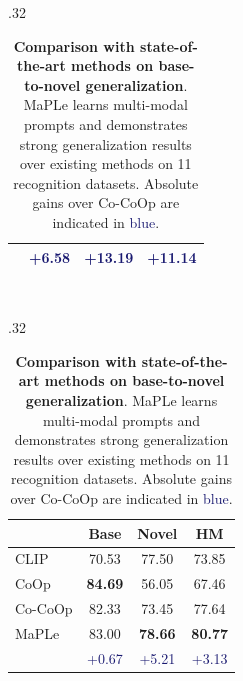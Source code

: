 \documentclass[10pt,twocolumn,letterpaper]{article}
\begin{document}
\begin{table}[t!]
\begin{subtable}[t]{.32\textwidth}
\begin{tabular}{l cc|c}
      &  \textcolor{MidnightBlue}{{+6.58}} &  \textcolor{MidnightBlue}{{+13.19}} &  \textcolor{MidnightBlue}{{+11.14}} \\
    \bottomrule
    \end{tabular}
    \end{subtable}
    ~
    \begin{subtable}[t]{.32\textwidth}
    \centering
    \caption{UCF101}
    \begin{tabular}{l cc|c}
    \toprule
    & Base & Novel & HM \\
    \midrule
    CLIP & 70.53 & {77.50} & 73.85 \\
    CoOp & \textbf{84.69} & 56.05 & 67.46 \\
    Co-CoOp & 82.33 & 73.45 & {77.64} \\
    \midrule
        \rowcolor{tabhighlight}
    MaPLe & 83.00 & \textbf{78.66} & \textbf{80.77} \\
     &  \textcolor{MidnightBlue}{{+0.67}} &  \textcolor{MidnightBlue}{{+5.21}} &  \textcolor{MidnightBlue}{{+3.13}} \\
    \bottomrule
    \end{tabular}
    \end{subtable}
    \caption{\small\textbf{Comparison with state-of-the-art methods on base-to-novel generalization}. MaPLe learns multi-modal prompts and demonstrates strong generalization results over existing methods on 11 recognition datasets. Absolute gains over Co-CoOp are indicated in \textcolor{MidnightBlue}{blue}.}
    \label{table:comparision_with_cocoop}
\end{table}
\end{document}
